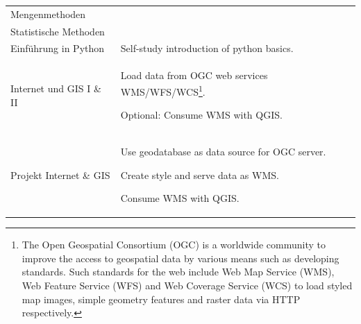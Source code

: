 \documentclass[11pt, a4paper, oneside, parskip=full-]{scrartcl}
\begin{document}
\begin{table}[!htbp]
\begin{tabularx}{\textwidth}{lX}
    \cmidrule(r){1-1} Mengenmethoden &  \\
    \cmidrule(r){1-1} Statistische Methoden &  \\
    \midrule
    Einführung in Python & Self-study introduction of python basics. \\
    \midrule
    Internet und GIS I \& II &
      \begin{itemize}[left=0pt,nosep,before={\begin{minipage}[t]{\hsize}},after
      ={\end{minipage}}]
      \item Load data from OGC web services WMS/WFS/WCS\footnote{The Open
      Geospatial Consortium (OGC) is a worldwide community to improve the access
      to geospatial data by various means such as developing standards. Such
      standards for the web include Web Map Service (WMS), Web Feature Service
      (WFS) and Web Coverage Service (WCS) to load styled map images, simple
      geometry features and raster data via HTTP respectively.}.
      \item Optional: Consume WMS with QGIS. \end{itemize}\nointerlineskip \\
    \midrule
    Projekt Internet \& GIS &
      \begin{itemize}[left=0pt,nosep,before={\begin{minipage}[t]{\hsize}},after
      ={\end{minipage}}]
      \item Use geodatabase as data source for OGC server.
      \item Create style and serve data as WMS.
      \item Consume WMS with QGIS. \end{itemize}\nointerlineskip \\
    \bottomrule
  \end{tabularx}%
\end{table}%

\end{document}
